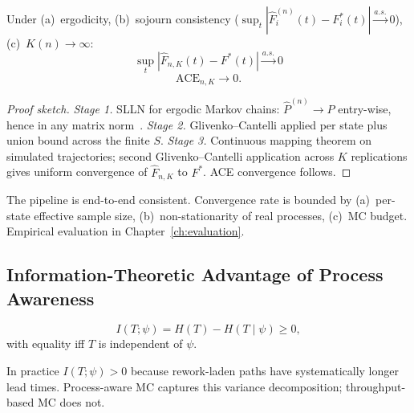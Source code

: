 \begin{theorem}
\label{thm:pipeline-convergence}
Under (a)~ergodicity, (b)~sojourn consistency
($\sup_t |\hat{F}_i^{(n)}(t) - F_i^*(t)| \xrightarrow{a.s.} 0$),
(c)~$K(n) \to \infty$:
\begin{equation}
\label{eq:pipeline-convergence}
\sup_t |\hat{F}_{n,K}(t) - F^*(t)| \xrightarrow{a.s.} 0
\end{equation}
\begin{equation}
\label{eq:ace-convergence}
\text{ACE}_{n,K} \to 0.
\end{equation}
\end{theorem}

\begin{proof}[Proof sketch]
\textit{Stage 1.} SLLN for ergodic Markov chains:
$\hat{P}^{(n)} \to P$ entry-wise, hence in any matrix
norm~\cite{billingsley1961statistical}.
\textit{Stage 2.} Glivenko–Cantelli applied per state plus union bound
across the finite $S$.
\textit{Stage 3.} Continuous mapping theorem on simulated trajectories;
second Glivenko–Cantelli application across $K$ replications gives
uniform convergence of $\hat{F}_{n,K}$ to $F^*$. ACE convergence follows.
\end{proof}

\begin{remark}
\label{rem:convergence-practical}
The pipeline is end-to-end consistent. Convergence rate is bounded by
(a)~per-state effective sample size, (b)~non-stationarity of real
processes, (c)~MC budget. Empirical evaluation in
Chapter~\ref{ch:evaluation}.
\end{remark}


\subsection{Information-Theoretic Advantage of Process Awareness}
\label{sec:prop-information}

\begin{theorem}
\label{thm:information}
\begin{equation}
\label{eq:information-gain}
I(T; \psi) = H(T) - H(T \mid \psi) \geq 0,
\end{equation}
with equality iff $T$ is independent of $\psi$.
\end{theorem}

In practice $I(T; \psi) > 0$ because rework-laden paths have
systematically longer lead times. Process-aware MC captures this variance
decomposition; throughput-based MC does not.


